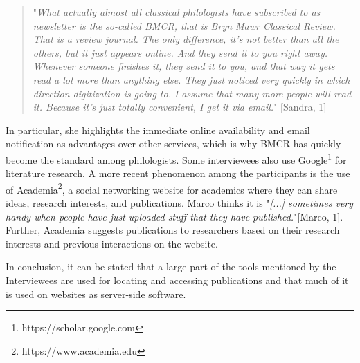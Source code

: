 \documentclass[12pt, a4paper, titlepage, oneside, abstract=true, toc=listof, toc=bibliography]{scrreprt}
\begin{document}
\begin{quotation}
"\textit{What actually almost all classical philologists have subscribed to as newsletter is the so-called BMCR, that is Bryn Mawr Classical Review. That is a review journal. The only difference, it's not better than all the others, but it just appears online. And they send it to you right away. Whenever someone finishes it, they send it to you, and that way it gets read a lot more than anything else. They just noticed very quickly in which direction digitization is going to. I assume that many more people will read it. Because it's just totally convenient, I get it via email.}" [Sandra, 1]
\end{quotation}

In particular, she highlights the immediate online availability and email notification as advantages over other services, which is why BMCR has quickly become the standard among philologists. %
Some interviewees also use \gls{Google}\footnote{https://scholar.google.com} for literature research. 
A more recent phenomenon among the participants is the use of \gls{Academia}\footnote{https://www.academia.edu}, a social networking website for academics where they can share ideas, research interests, and publications. Marco thinks it is "\textit{[...] sometimes very handy when people have just uploaded stuff that they have published.}"[Marco, 1]. Further, Academia suggests publications to researchers based on their research interests and previous interactions on the website.

In conclusion, it can be stated that a large part of the tools mentioned by the Interviewees are used for locating and accessing publications and that much of it is used on websites as server-side software.
\end{document}
